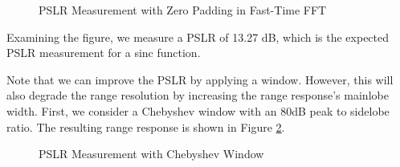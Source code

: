 \documentclass[conference]{IEEEtran}
\begin{document}
	\begin{figure}[H]
	    	\centering
	    	\caption{PSLR Measurement with Zero Padding in Fast-Time FFT}
	    	\label{fig::pslr_zpad}
	\end{figure}
	
	Examining the figure, we measure a PSLR of 13.27 dB, which is the expected PSLR measurement for a sinc function.
	
	Note that we can improve the PSLR by applying a window. However, this will also degrade the range resolution by increasing the range response's mainlobe width. First, we consider a Chebyshev window with an 80dB peak to sidelobe ratio. The resulting range response is shown in Figure \ref{fig::plsr_window}.
	
	\begin{figure}[H]
	    	\centering
	    	\caption{PSLR Measurement with Chebyshev Window}
	    	\label{fig::plsr_window} 
	\end{figure}
	
\end{document}
